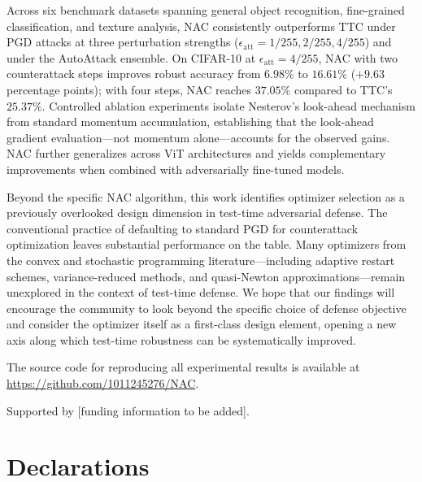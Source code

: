 \documentclass[pdflatex,sn-basic,Numbered]{sn-jnl}
\theoremstyle{thmstyleone}
\theoremstyle{thmstyletwo}
\theoremstyle{thmstylethree}
\begin{document}
Across six benchmark datasets spanning general object recognition, fine-grained classification, and texture analysis, NAC consistently outperforms TTC under PGD attacks at three perturbation strengths ($\epsilon_{\text{att}} = 1/255, 2/255, 4/255$) and under the AutoAttack ensemble. On CIFAR-10 at $\epsilon_{\text{att}}=4/255$, NAC with two counterattack steps improves robust accuracy from $6.98\%$ to $16.61\%$ ($+9.63$ percentage points); with four steps, NAC reaches $37.05\%$ compared to TTC's $25.37\%$. Controlled ablation experiments isolate Nesterov's look-ahead mechanism from standard momentum accumulation, establishing that the look-ahead gradient evaluation---not momentum alone---accounts for the observed gains. NAC further generalizes across ViT architectures and yields complementary improvements when combined with adversarially fine-tuned models.

Beyond the specific NAC algorithm, this work identifies optimizer selection as a previously overlooked design dimension in test-time adversarial defense. The conventional practice of defaulting to standard PGD for counterattack optimization leaves substantial performance on the table. Many optimizers from the convex and stochastic programming literature---including adaptive restart schemes, variance-reduced methods, and quasi-Newton approximations---remain unexplored in the context of test-time defense. We hope that our findings will encourage the community to look beyond the specific choice of defense objective and consider the optimizer itself as a first-class design element, opening a new axis along which test-time robustness can be systematically improved.

\backmatter


The source code for reproducing all experimental results is available at \url{https://github.com/1011245276/NAC}.


Supported by [funding information to be added].

\section*{Declarations}
\end{document}
